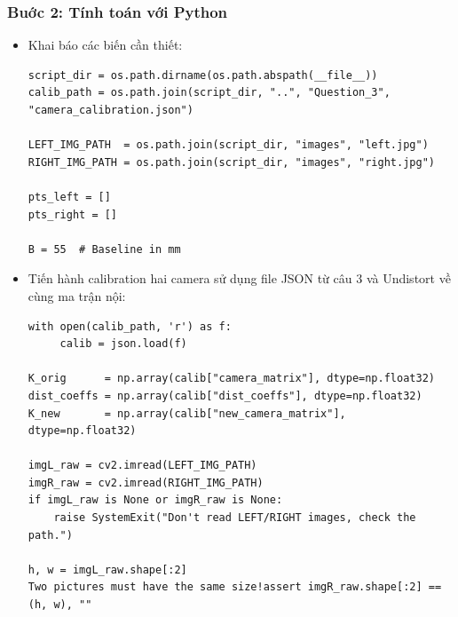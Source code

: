           \subsubsection{Buớc 2: Tính toán với Python}
               \begin{itemize}
                    \item Khai báo các biến cần thiết:
                    \begin{lstlisting}
script_dir = os.path.dirname(os.path.abspath(__file__))
calib_path = os.path.join(script_dir, "..", "Question_3", "camera_calibration.json")

LEFT_IMG_PATH  = os.path.join(script_dir, "images", "left.jpg")
RIGHT_IMG_PATH = os.path.join(script_dir, "images", "right.jpg")

pts_left = []
pts_right = []

B = 55  # Baseline in mm
                    \end{lstlisting} 
                    \item Tiến hành calibration hai camera sử dụng file JSON từ câu 3 và Undistort về cùng ma trận nội:
                    \begin{lstlisting}
with open(calib_path, 'r') as f:
     calib = json.load(f)
    
K_orig      = np.array(calib["camera_matrix"], dtype=np.float32)
dist_coeffs = np.array(calib["dist_coeffs"], dtype=np.float32)
K_new       = np.array(calib["new_camera_matrix"], dtype=np.float32)

imgL_raw = cv2.imread(LEFT_IMG_PATH)
imgR_raw = cv2.imread(RIGHT_IMG_PATH)
if imgL_raw is None or imgR_raw is None:
    raise SystemExit("Don't read LEFT/RIGHT images, check the path.")

h, w = imgL_raw.shape[:2]
Two pictures must have the same size!assert imgR_raw.shape[:2] == (h, w), ""


\end{lstlisting}
\end{itemize}
